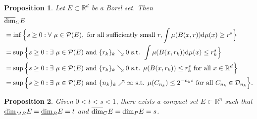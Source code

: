 \documentclass[10pt,a4paper]{amsart}
\newtheorem{prop}{Proposition}
\newcommand{\D}{\mathcal{D}}
\def\bbbr{\mathbb{R}}
\newcommand\lbd{\underline{\mbox{\rm dim}}_{\rm B}} %
\newcommand\mlbd{\underline{\mbox{\rm dim}}_{\rm MB}} %
\newcommand\pkd{\mbox{\rm dim}_{\rm P}} %
\newcommand\ucod{\overline{\mbox{\rm dim}}_{\rm C}} %
\begin{document}
\begin{prop}\label{cordim}
Let $E \subset \mathbb{R}^d$ be a Borel set. Then
\begin{align}
&\ucod E\nonumber\\
&= \inf\Big\{s \geq 0:  \forall\ \mu \in {\mathcal P}(E), \text{ for all sufficiently small }r, \int \mu(B(x,r))\mathrm{d}\mu(x) \geq r^{s } \Big\} \label{cd1}\\
&= \sup\Big\{s \geq 0: \exists\ \mu \in {\mathcal P}(E)  \text{ and $\{r_k\}_k\searrow 0 $ s.t.  } \int \mu(B(x,r_k))\mathrm{d}\mu(x) \leq r_k^{s } \Big\} \label{cd2} \\
&= \sup\Big\{s \geq 0: \exists\   \mu \in {\mathcal P}(E)  \text{ and $\{r_k\}_k\searrow 0 $ s.t.  } \mu(B(x,r_k))\leq r_k^{s } \text{ for all } x \in \mathbb{R}^d\Big\}\label{cd3}\\
&= \sup\Big\{s \geq 0: \exists\   \mu \in {\mathcal P}(E)  \text{ and $\{n_k\}_k\nearrow\infty $ s.t.  } \mu(C_{n_k})\leq 2^{-n_ks}  \text{ for all } C_{n_k}  \in \D_{n_k}\Big\}\label{cd4}.
\end{align}
\end{prop}

\begin{prop}\label{example1}
Given $0<t<s<1$, there exists a compact set $E\subset \bbbr^n$ such that $\mlbd E=\lbd E  = t$  and $\ucod E=\pkd E =s$.
\end{prop}
\end{document}

